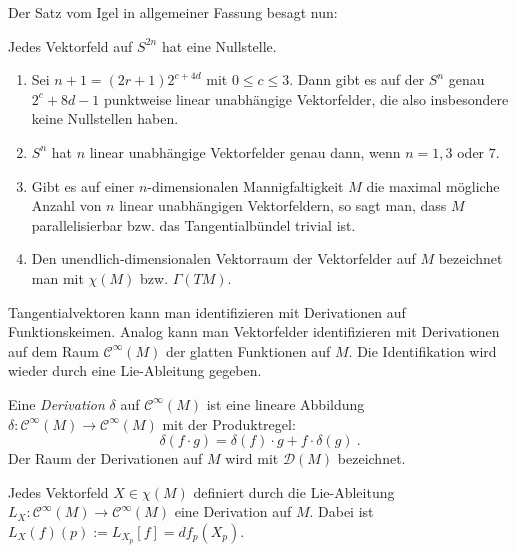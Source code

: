 \documentclass[%
	paper=a5,%
	fleqn,%
	DIV=18,%
	BCOR=0mm,
	fontsize=11pt,
	titlepage=false,%
	bibliography=totoc,
	DIV=18,%
	twoside=true,
	pdftitle=Riemannsche Geometrie,
	pdfauthor=Uwe Semmelmann,
	numbers=noendperiod]%
	{scrbook}
\begin{document}
Der Satz vom Igel in allgemeiner Fassung besagt nun:
\medskip

\begin{prop}
Jedes Vektorfeld auf $S^{2n}$ hat eine Nullstelle.\fish
\end{prop}

\bigskip

\begin{rem*}[Bemerkungen.]
\begin{enumerate}
\item
Sei $n+1= (2r+1)2^{c+4d}$ mit $0\le c \le 3$. Dann gibt es auf der $S^n$
genau $2^c+8d-1$ punktweise linear unabh\"angige Vektorfelder, die also
insbesondere keine Nullstellen haben.

\item
$S^n$ hat $n$ linear unabh\"angige Vektorfelder genau dann, wenn $n=1,3$ oder $7$.

\item
Gibt es auf einer $n$-dimensionalen Mannigfaltigkeit $M$ die maximal m\"ogliche
Anzahl von $n$ linear unabh\"angigen Vektorfeldern, so sagt man, dass $M$
parallelisierbar bzw. das Tangentialb\"undel trivial ist.

\item
Den unendlich-dimensionalen Vektorraum der Vektorfelder auf $M$ bezeichnet man mit
$\chi(M)$ bzw. $\Gamma(TM)$.
\end{enumerate}
\end{rem*}

\bigskip

Tangentialvektoren kann man identifizieren mit Derivationen auf Funktionskeimen. Analog
kann man Vektorfelder identifizieren mit Derivationen auf dem Raum $\mathcal C^\infty(M)$
der glatten Funktionen auf $M$. Die Identifikation wird wieder durch eine Lie-Ableitung
gegeben.

\begin{Definition}
Eine \emph{ Derivation} $\delta$ auf $\mathcal C^\infty(M)$ ist eine lineare Abbildung
$\delta : \mathcal C^\infty(M)\rightarrow \mathcal C^\infty(M)$ mit der Produktregel:
$$
\delta (f\cdot g) = \delta(f) \cdot g + f \cdot \delta(g) \ .
$$
Der Raum der Derivationen auf $M$ wird mit $\mathcal D(M)$ bezeichnet.\fish
\end{Definition}

\bigskip

\begin{ex} Jedes Vektorfeld $X\in \chi(M)$ definiert durch die Lie-Ableitung
$L_X:\mathcal C^\infty(M)\rightarrow \mathcal C^\infty(M)$ eine Derivation auf $M$.
Dabei ist $L_X(f)(p) := L_{X_p}[f] = df_p(X_p)$.\boxc
\end{ex}
\end{document}

